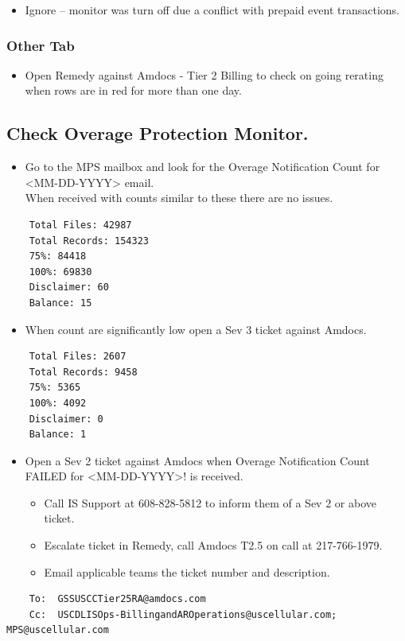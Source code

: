 \documentclass[12pt,twoside]{article}
\begin{document}
\begin{itemize}
\item Ignore – monitor  was turn off due a conflict with prepaid event transactions.
\end{itemize}
\subsubsection{Other Tab}
\label{sec-4-1-5}

\begin{itemize}
\item Open Remedy against Amdocs - Tier 2 Billing to check on going rerating when rows are in red for more than one day.
\end{itemize}
\subsection{Check Overage Protection Monitor.}
\label{sec-4-2}

\begin{itemize}
\item Go to the MPS mailbox and look for the Overage Notification Count for <MM-DD-YYYY> email.\\
When received with counts similar to these there are no issues.
\end{itemize}
\begin{verbatim}
    Total Files: 42987
    Total Records: 154323
    75%: 84418
    100%: 69830
    Disclaimer: 60
    Balance: 15
\end{verbatim}
\begin{itemize}
\item When count are significantly low open a Sev 3 ticket against Amdocs.
\end{itemize}
\begin{verbatim}
    Total Files: 2607
    Total Records: 9458
    75%: 5365
    100%: 4092
    Disclaimer: 0
    Balance: 1
\end{verbatim}
\begin{itemize}
\item Open a Sev 2 ticket against Amdocs when Overage Notification Count FAILED for <MM-DD-YYYY>! is received.
\begin{itemize}
\item Call IS Support at 608-828-5812 to inform them of a Sev 2 or above ticket.
\item Escalate ticket in Remedy, call Amdocs T2.5 on call at 217-766-1979.
\item Email applicable teams the ticket number and description.
\end{itemize}
\end{itemize}
\begin{verbatim}
    To:  GSSUSCCTier25RA@amdocs.com
    Cc:  USCDLISOps-BillingandAROperations@uscellular.com; MPS@uscellular.com
\end{verbatim}
 
\end{document}
